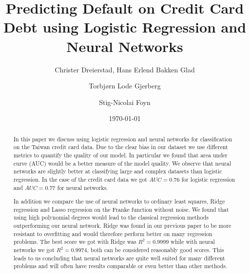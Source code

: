 \documentclass[%
 reprint,
nofootinbib,
 amsmath,amssymb,
 aps,
]{revtex4-2}
\begin{document}

\title{Predicting Default on Credit Card Debt using Logistic Regression and Neural Networks}%

\author{Christer Dreierstad, Hans Erlend Bakken Glad}
\author{Torbjørn Lode Gjerberg}
\author{Stig-Nicolai Foyn}


\date{\today}

\begin{abstract}
In this paper we discuss using logistic regression and neural networks for classification on the Taiwan credit card data. Due to the clear bias in our dataset we use different metrics to quantify the quality of our model. In particular we found that area under curve (AUC) would be a better measure of the model quality. We observe that neural networks are slightly better at classifying large and complex datasets than logistic regression. In the case of the credit card data we got $AUC = 0.76$ for logistic regression and $AUC = 0.77$ for neural networks.

In addition we compare the use of neural networks to ordinary least squares, Ridge regression and Lasso regression on the Franke function without noise. We found that using high polynomial degrees would lead to the classical regression methods outperforming our neural network. Ridge was found in our previous paper to be more resistant to overfitting and would therefore perform better on many regression problems. The best score we got with Ridge was $R^2 = 0.9999$ while with neural networks we got $R^2 = 0.9974$, both can be considered reasonably good scores. This leads to us concluding that neural networks are quite well suited for many different problems and will often have results comparable or even better than other methods.
\end{abstract}

\maketitle
\end{document}
